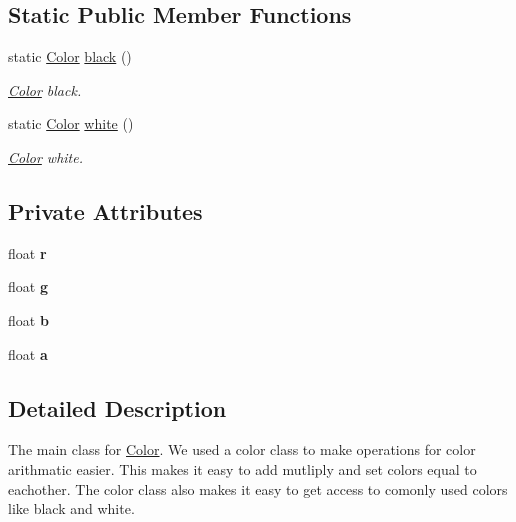 \subsection*{Static Public Member Functions}
\begin{DoxyCompactItemize}
\item 
\mbox{\label{classColor_aba1c3be96b5e25fbae9c769d3491e333}} 
static \hyperlink{classColor}{Color} \hyperlink{classColor_aba1c3be96b5e25fbae9c769d3491e333}{black} ()
\begin{DoxyCompactList}\small\item\em \hyperlink{classColor}{Color} black. \end{DoxyCompactList}\item 
\mbox{\label{classColor_aad4699ae003d7a86b5edc5fccdbaf4c8}} 
static \hyperlink{classColor}{Color} \hyperlink{classColor_aad4699ae003d7a86b5edc5fccdbaf4c8}{white} ()
\begin{DoxyCompactList}\small\item\em \hyperlink{classColor}{Color} white. \end{DoxyCompactList}\end{DoxyCompactItemize}
\subsection*{Private Attributes}
\begin{DoxyCompactItemize}
\item 
\mbox{\label{classColor_a3958a556b47d2de3dd45c75aac833c20}} 
float {\bfseries r}
\item 
\mbox{\label{classColor_a5defbb21620e480e556181772d665f34}} 
float {\bfseries g}
\item 
\mbox{\label{classColor_a33e482be18d6ea31d2b403bee13683b7}} 
float {\bfseries b}
\item 
\mbox{\label{classColor_a98047aee65fc3d825f88a76da728fd27}} 
float {\bfseries a}
\end{DoxyCompactItemize}


\subsection{Detailed Description}
The main class for \hyperlink{classColor}{Color}. We used a color class to make operations for color arithmatic easier. This makes it easy to add mutliply and set colors equal to eachother. The color class also makes it easy to get access to comonly used colors like black and white. 

